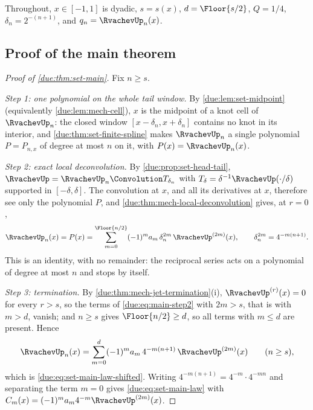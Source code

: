 \documentclass[11pt,oneside]{article}
\theoremstyle{plain}
\theoremstyle{definition}
\theoremstyle{remark}
\newcommand{\upn}[1]{\RvachevUp_{#1}}
\newcommand{\dep}[1]{s\!\left(#1\right)}                    %
\newcommand{\Qq}{Q}                                         %
\newcommand{\am}[1]{a_{#1}}                                 %
\newcommand{\Cr}[2]{C_{#1}\!\left(#2\right)}                %
\newcommand{\qn}[1]{q_{#1}}                                 %
\begin{document}
Throughout, $x\in[-1,1]$ is dyadic, $s=\dep{x}$, $d=\Floor{s/2}$,
$\Qq=1/4$, $\delta_n=2^{-(n+1)}$, and $\qn{n}=\upn{n}(x)$.

\subsection{Proof of the main theorem}
\label{due:sec:main-proof}

\begin{proof}[Proof of \cref{due:thm:set-main}]
Fix $n\ge s$.

\emph{Step 1: one polynomial on the whole tail window.}
By \cref{due:lem:set-midpoint} (equivalently \cref{due:lem:mech-cell}),
$x$ is the midpoint of a knot cell of $\upn{n}$: the closed window
$[x-\delta_n,x+\delta_n]$ contains no knot in its interior, and
\cref{due:thm:set-finite-spline} makes $\upn{n}$ a single polynomial
$P=P_{n,x}$ of degree at most $n$ on it, with $P(x)=\upn{n}(x)$.

\emph{Step 2: exact local deconvolution.}
By \cref{due:prop:set-head-tail}, $\RvachevUp=\upn{n}\Convolution T_{\delta_n}$
with $T_{\delta}=\delta^{-1}\RvachevUp(\cdot/\delta)$ supported in
$[-\delta,\delta]$.  The convolution at $x$, and all its derivatives at
$x$, therefore see only the polynomial $P$, and
\cref{due:thm:mech-local-deconvolution} gives, at $r=0$,
\begin{equation}
 \upn{n}(x)=P(x)
 =\sum_{m=0}^{\Floor{n/2}}(-1)^{m}\am{m}\,\delta_n^{2m}\,\RvachevUp^{(2m)}(x),
 \qquad \delta_n^{2m}=4^{-m(n+1)} .
 \label{due:eq:main-step2}
\end{equation}
This is an identity, with no remainder: the reciprocal series acts on a
polynomial of degree at most $n$ and stops by itself.

\emph{Step 3: termination.}
By \cref{due:thm:mech-jet-termination}(i), $\RvachevUp^{(r)}(x)=0$ for every
$r>s$, so the terms of \cref{due:eq:main-step2} with $2m>s$, that is with
$m>d$, vanish; and $n\ge s$ gives $\Floor{n/2}\ge d$, so all terms with
$m\le d$ are present.  Hence
\begin{equation}
 \upn{n}(x)=\sum_{m=0}^{d}(-1)^{m}\am{m}\,4^{-m(n+1)}\,\RvachevUp^{(2m)}(x)
 \qquad(n\ge s),
 \label{due:eq:main-step3}
\end{equation}
which is \cref{due:eq:set-main-law-shifted}.  Writing
$4^{-m(n+1)}=4^{-m}\cdot4^{-mn}$ and separating the term $m=0$ gives
\cref{due:eq:set-main-law} with
$\Cr{m}{x}=(-1)^{m}\am{m}4^{-m}\RvachevUp^{(2m)}(x)$.


\end{proof}
\end{document}
